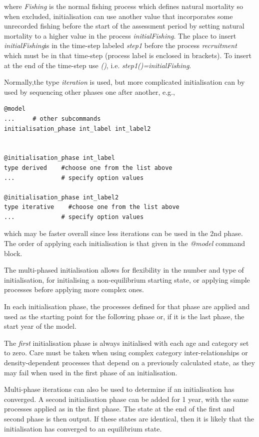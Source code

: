 where \textit{ Fishing} is the normal fishing process which defines natural mortality so when excluded, initialisation can use another value that incorporates some unrecorded fishing before the start of the assessment period by setting natural mortality to a higher value in the process \textit{initialFishing}. 
The place to insert \textit{initialFishing}is in the time-step labeled \textit{step1} before the process \textit{recruitment} which must be in that time-step (process label is enclosed in brackets). To insert at the end of the time-step use \textit{()}, i.e. \textit{step1()=initialFishing}.

Normally,the type \textit{iteration} is used, but more complicated initialisation can by used by sequencing other phases one after another, e.g.,

{\small{\begin{verbatim}
@model
...     # other subcommands
initialisation_phase int_label int_label2


@initialisation_phase int_label
type derived    #choose one from the list above
...             # specify option values

@initialisation_phase int_label2
type iterative    #choose one from the list above
...             # specify option values

\end{verbatim}}}
which may be faster overall since less iterations can be used in the 2nd phase. The order of applying each initialisation is that given in the \textit{@model} command block.
 
The multi-phased initialisation allows for flexibility in the number and type of initialisation, for initialising a non-equilibrium starting state, or applying simple processes before applying more complex ones.

In each initialisation phase, the processes defined for that phase are applied and used as the starting point for the following phase or, if it is the last phase, the start year of the model.

The \emph{first} initialisation phase is always initialised with each age and category set to zero. Care must be taken when using complex category inter-relationships or density-dependent processes that depend on a previously calculated state, as they may fail when used in the first phase of an initialisation.

Multi-phase iterations can also be used to determine if an initialisation has converged. A second initialisation phase can be added for 1 year, with the same processes applied as in the first phase. The state at the end of the first and second phase is then output. If these states are identical, then it is likely that the initialisation has converged to an equilibrium state.

